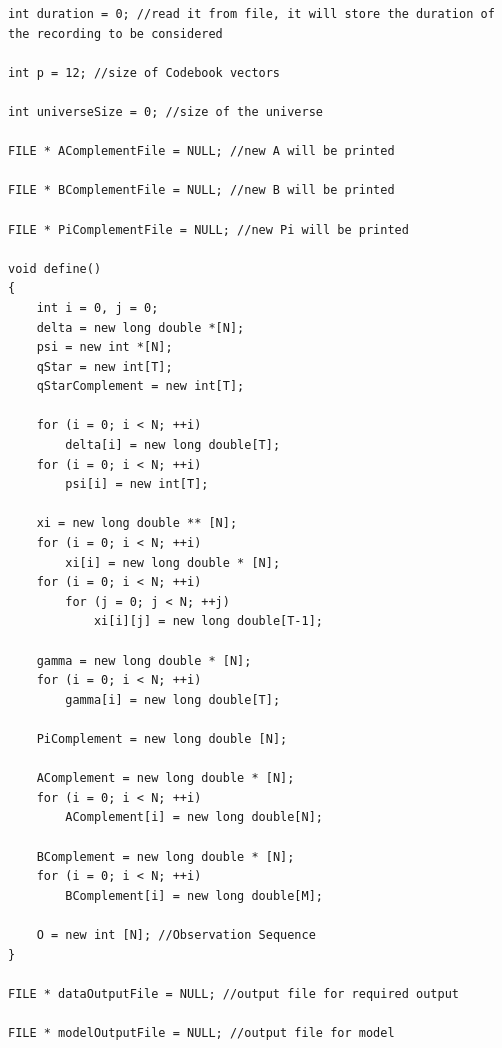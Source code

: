 \documentclass{article}
\begin{document}
\begin{lstlisting}
int duration = 0; //read it from file, it will store the duration of the recording to be considered

int p = 12; //size of Codebook vectors

int universeSize = 0; //size of the universe

FILE * AComplementFile = NULL; //new A will be printed

FILE * BComplementFile = NULL; //new B will be printed

FILE * PiComplementFile = NULL; //new Pi will be printed

void define()
{
	int i = 0, j = 0;
	delta = new long double *[N];
	psi = new int *[N];
	qStar = new int[T];
	qStarComplement = new int[T];

	for (i = 0; i < N; ++i)
		delta[i] = new long double[T];
	for (i = 0; i < N; ++i)
		psi[i] = new int[T];

	xi = new long double ** [N];
	for (i = 0; i < N; ++i)
		xi[i] = new long double * [N];
	for (i = 0; i < N; ++i)
		for (j = 0; j < N; ++j)
			xi[i][j] = new long double[T-1];

	gamma = new long double * [N];
	for (i = 0; i < N; ++i)
		gamma[i] = new long double[T];

	PiComplement = new long double [N];

	AComplement = new long double * [N];
	for (i = 0; i < N; ++i)
		AComplement[i] = new long double[N];

	BComplement = new long double * [N];
	for (i = 0; i < N; ++i)
		BComplement[i] = new long double[M];

	O = new int [N]; //Observation Sequence
}

FILE * dataOutputFile = NULL; //output file for required output

FILE * modelOutputFile = NULL; //output file for model	
\end{lstlisting}

\end{document}
